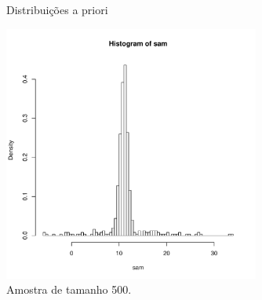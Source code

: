 \documentclass[12pt,reqno,a4paper,oneside]{report}
\begin{document}
\begin{figure}[!htb]
	\centering
	\caption{Distribuições a priori}
	\label{fig:priori}
\end{figure}

\begin{figure}[!htb]
	\centering
	\includegraphics[width=0.75\textwidth]{figuras/parte1/amostra_n.pdf}
	\caption{Amostra de tamanho 500.}
	\label{fig:sample}
\end{figure}
\end{document}

